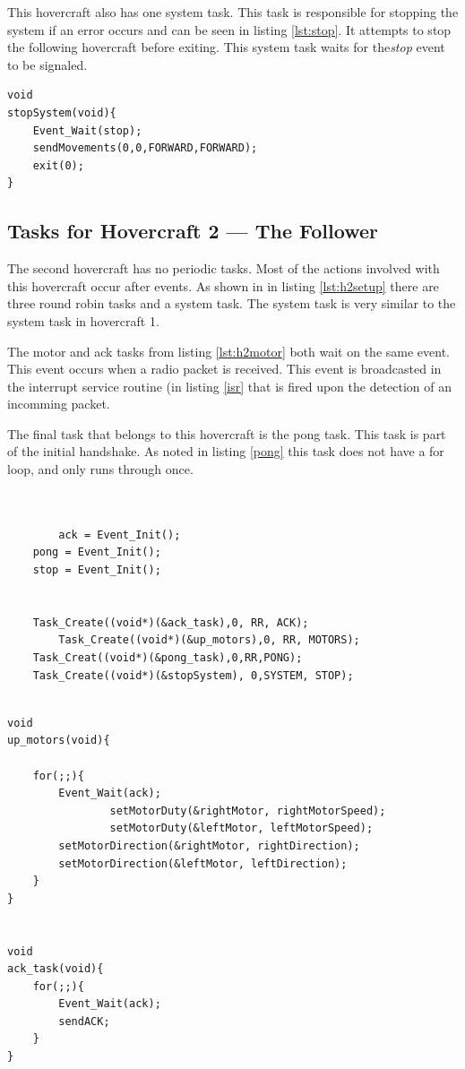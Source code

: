 This hovercraft also has one system task. This task is responsible for
stopping the system if an error occurs and can be seen in listing \ref{lst:stop}. It attempts to stop the following
hovercraft before exiting. This system task waits for the\textit{stop} event
to be signaled.

\begin{lstlisting}[label=lst:stop, float=th, caption={\texttt{STOP} Task}]
void
stopSystem(void){
	Event_Wait(stop);
	sendMovements(0,0,FORWARD,FORWARD);
	exit(0);
}

\end{lstlisting}



\subsection{Tasks for Hovercraft 2 --- The Follower}

The second hovercraft has no periodic tasks. Most of the actions involved with
this hovercraft occur after events. As shown in in listing \ref{lst:h2setup}
there are three round robin tasks and a system task. The system task is very
similar to the system task in hovercraft 1. 


The motor and ack tasks from listing \ref{lst:h2motor} both wait on the same
event. This event occurs when a radio packet is received. This event is
broadcasted in the interrupt service routine (in listing \ref{isr} that is fired upon the detection
of an incomming packet.

The final task that belongs to this hovercraft is the pong task. This task is
part of the initial handshake. As noted in listing \ref{pong} this task does
not have a for loop, and only runs through once.

\begin{lstlisting}[label=lst:h2setup, float=th, caption={The Setup
calls for Hovercraft 2}]


        ack = Event_Init();
	pong = Event_Init();
	stop = Event_Init();

    
	Task_Create((void*)(&ack_task),0, RR, ACK);
        Task_Create((void*)(&up_motors),0, RR, MOTORS);
	Task_Creat((void*)(&pong_task),0,RR,PONG);
	Task_Create((void*)(&stopSystem), 0,SYSTEM, STOP);

 \end{lstlisting}



\begin{lstlisting}[label=lst:h2motor, float=th, caption={\texttt{MOTOR} Task}]

void
up_motors(void){

	for(;;){
		Event_Wait(ack);
                setMotorDuty(&rightMotor, rightMotorSpeed);	
                setMotorDuty(&leftMotor, leftMotorSpeed);
		setMotorDirection(&rightMotor, rightDirection);
		setMotorDirection(&leftMotor, leftDirection);
	}		
}	


void
ack_task(void){
	for(;;){
		Event_Wait(ack);
		sendACK;
	}
}

 \end{lstlisting}

